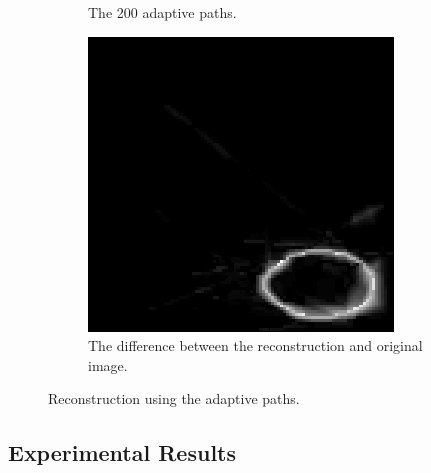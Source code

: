 \documentclass[english]{article}\usepackage[]{graphicx}\usepackage[]{color}
\begin{document}
\begin{figure}
\begin{subfigure}{.22\textwidth}
  \caption{The 200 adaptive paths.}
  \vspace{0pt}
  \label{fig:adp_adpaths}
\end{subfigure}%
\hspace {10pt}
\begin{subfigure}{.22\textwidth}
  \centering
    \includegraphics[width=1\linewidth]{figures/adaptiveresulterror}
  \caption{The difference between the reconstruction and original image.}
  \vspace{0pt}
  \label{fig:adp_adpaths_sim_diff}
\end{subfigure}
\caption{Reconstruction using the adaptive paths.}
\label{fig:adp_adpaths_sim_fig}

\end{figure}


\subsection{Experimental Results}
\end{document}

